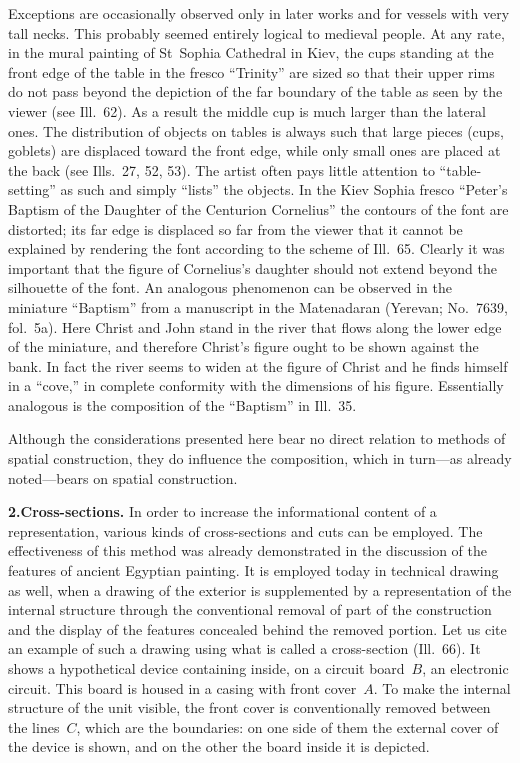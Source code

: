 Exceptions are occasionally observed only in later works and for vessels with very tall
necks.  This probably seemed entirely logical to medieval people.  At any rate, in the
mural painting of St~Sophia Cathedral in Kiev, the cups standing at the front edge of
the table in the fresco ``Trinity'' are sized so that their upper rims do not pass beyond
the depiction of the far boundary of the table as seen by the viewer (see Ill.~62).  As
a result the middle cup is much larger than the lateral ones.  The distribution of objects
on tables is always such that large pieces (cups, goblets) are displaced toward the front
edge, while only small ones are placed at the back (see Ills.~27, 52, 53).  The artist
often pays little attention to ``table-setting'' as such and simply ``lists'' the objects.
In the Kiev Sophia fresco ``Peter's Baptism of the Daughter of the Centurion Cornelius''
the contours of the font are distorted; its far edge is displaced so far from the viewer
that it cannot be explained by rendering the font according to the scheme of Ill.~65.
Clearly it was important that the figure of Cornelius's daughter should not extend beyond
the silhouette of the font.  An analogous phenomenon can be observed in the miniature
``Baptism'' from a manuscript in the Matenadaran (Yerevan; No.~7639, fol.~5a).  Here
Christ and John stand in the river that flows along the lower edge of the miniature, and
therefore Christ's figure ought to be shown against the bank.  In fact the river seems
to widen at the figure of Christ and he finds himself in a ``cove,'' in complete
conformity with the dimensions of his figure.  Essentially analogous is the composition
of the ``Baptism'' in Ill.~35.

Although the considerations presented here bear no direct relation to methods of spatial
construction, they do influence the composition, which in turn---as already noted---bears
on spatial construction.


\noindent\textbf{2.}\quad\textbf{Cross-sections.}
In order to increase the informational content of a representation, various kinds of
cross-sections and cuts can be employed.  The effectiveness of this method was already
demonstrated in the discussion of the features of ancient Egyptian painting.  It is
employed today in technical drawing as well, when a drawing of the exterior is supplemented
by a representation of the internal structure through the conventional removal of part of
the construction and the display of the features concealed behind the removed portion.
Let us cite an example of such a drawing using what is called a cross-section (Ill.~66).
It shows a hypothetical device containing inside, on a circuit board~$B$, an electronic
circuit.  This board is housed in a casing with front cover~$A$.  To make the internal
structure of the unit visible, the front cover is conventionally removed between the
lines~$C$, which are the boundaries: on one side of them the external cover of the device
is shown, and on the other the board inside it is depicted.

